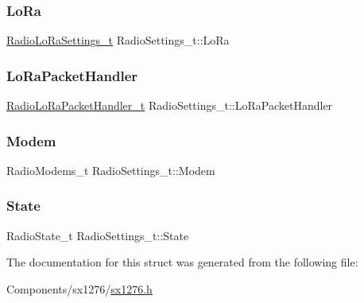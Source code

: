 \subsubsection{\texorpdfstring{Lo\+Ra}{LoRa}}
{\footnotesize\ttfamily \hyperlink{structRadioLoRaSettings__t}{Radio\+Lo\+Ra\+Settings\+\_\+t} Radio\+Settings\+\_\+t\+::\+Lo\+Ra}

\mbox{\label{structRadioSettings__t_a1a94014a708421cec9ff3095e5614784}} 
\subsubsection{\texorpdfstring{Lo\+Ra\+Packet\+Handler}{LoRaPacketHandler}}
{\footnotesize\ttfamily \hyperlink{structRadioLoRaPacketHandler__t}{Radio\+Lo\+Ra\+Packet\+Handler\+\_\+t} Radio\+Settings\+\_\+t\+::\+Lo\+Ra\+Packet\+Handler}

\mbox{\label{structRadioSettings__t_a30e9dbea56513318361cffc63da1e4dc}} 
\subsubsection{\texorpdfstring{Modem}{Modem}}
{\footnotesize\ttfamily Radio\+Modems\+\_\+t Radio\+Settings\+\_\+t\+::\+Modem}

\mbox{\label{structRadioSettings__t_ad051d6eb4b33aa5a5027e84535821d63}} 
\subsubsection{\texorpdfstring{State}{State}}
{\footnotesize\ttfamily Radio\+State\+\_\+t Radio\+Settings\+\_\+t\+::\+State}



The documentation for this struct was generated from the following file\+:\begin{DoxyCompactItemize}
\item 
Components/sx1276/\hyperlink{sx1276_8h}{sx1276.\+h}\end{DoxyCompactItemize}

